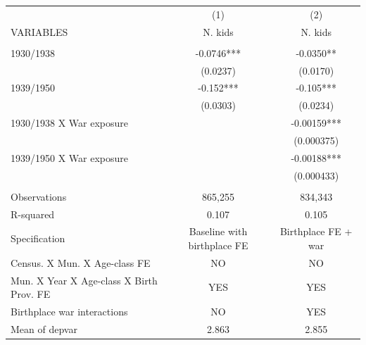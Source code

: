 \begin{tabular}{lcc} \hline
 & (1) & (2) \\
VARIABLES & N. kids & N. kids \\ \hline
 &  &  \\
1930/1938 & -0.0746*** & -0.0350** \\
 & (0.0237) & (0.0170) \\
1939/1950 & -0.152*** & -0.105*** \\
 & (0.0303) & (0.0234) \\
1930/1938 X War exposure &  & -0.00159*** \\
 &  & (0.000375) \\
1939/1950 X War exposure &  & -0.00188*** \\
 &  & (0.000433) \\
 &  &  \\
Observations & 865,255 & 834,343 \\
R-squared & 0.107 & 0.105 \\
Specification & Baseline with birthplace FE & Birthplace FE + war \\
Census. X Mun. X Age-class FE & NO & NO \\
Mun. X Year X Age-class X Birth Prov. FE & YES & YES \\
Birthplace war interactions & NO & YES \\
 Mean of depvar & 2.863 & 2.855 \\ \hline
\end{tabular}
